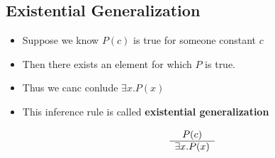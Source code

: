 \documentclass{scrreprt}
\begin{document}
\subsection{Existential Generalization}
\begin{itemize}
	\item Suppose we know $P(c)$ is true for someone constant $c$
	\item Then there exists an element for which $P$ is true.
	\item Thus we canc conlude $\exists x. P(x)$
	\item This inference rule is called \textbf{existential generalization}

	\[
		\begin{array}[]{c}
			P(c) \\
			\hline
			\exists x. P(x)
			
		\end{array}
	\]
\end{itemize}
\end{document}
